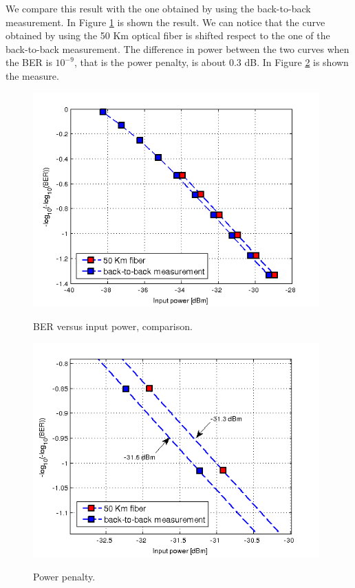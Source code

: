 \documentclass[a4paper,10pt]{report}
\begin{document}
We compare this result with the one obtained by using the back-to-back measurement. In Figure \ref{ex6_2} is shown the result.
We can notice that the curve obtained by using the 50 Km optical fiber is shifted respect to the one of the back-to-back measurement.
The difference in power between the two curves when the BER is $10^{-9}$, that is the power penalty, is about 0.3 dB.
In Figure \ref{ex6_3} is shown the measure.

\begin{figure}[!ht]
   \centering
   \includegraphics[width=11cm]{ex6_2.png}\\
   \caption{BER versus input power, comparison.}
   \label{ex6_2}
\end{figure}

\begin{figure}[!ht]
   \centering
   \includegraphics[width=11cm]{ex6_3.png}\\
   \caption{Power penalty.}
   \label{ex6_3}
\end{figure}
\end{document}
